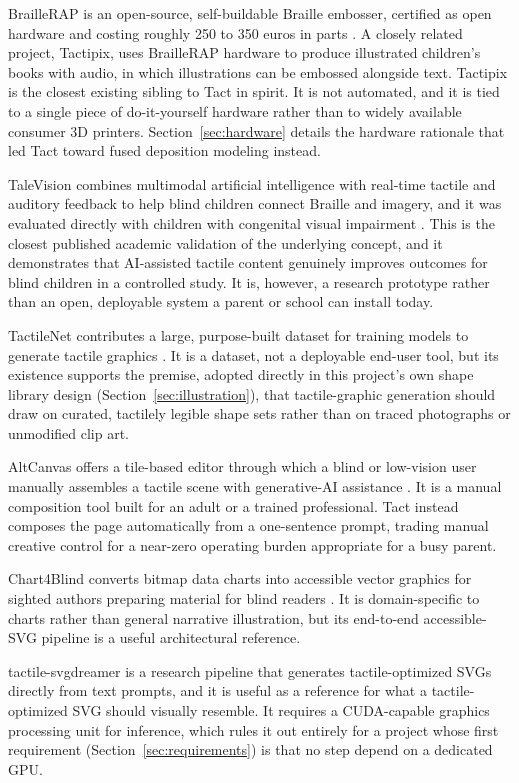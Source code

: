 \documentclass[conference]{IEEEtran}
\begin{document}
BrailleRAP is an open-source, self-buildable Braille embosser, certified as open hardware and costing roughly 250 to 350 euros in parts \cite{braillerap}. A closely related project, Tactipix, uses BrailleRAP hardware to produce illustrated children's books with audio, in which illustrations can be embossed alongside text. Tactipix is the closest existing sibling to Tact in spirit. It is not automated, and it is tied to a single piece of do-it-yourself hardware rather than to widely available consumer 3D printers. Section~\ref{sec:hardware} details the hardware rationale that led Tact toward fused deposition modeling instead.

TaleVision combines multimodal artificial intelligence with real-time tactile and auditory feedback to help blind children connect Braille and imagery, and it was evaluated directly with children with congenital visual impairment \cite{talevision}. This is the closest published academic validation of the underlying concept, and it demonstrates that AI-assisted tactile content genuinely improves outcomes for blind children in a controlled study. It is, however, a research prototype rather than an open, deployable system a parent or school can install today.

TactileNet contributes a large, purpose-built dataset for training models to generate tactile graphics \cite{tactilenet}. It is a dataset, not a deployable end-user tool, but its existence supports the premise, adopted directly in this project's own shape library design (Section~\ref{sec:illustration}), that tactile-graphic generation should draw on curated, tactilely legible shape sets rather than on traced photographs or unmodified clip art.

AltCanvas offers a tile-based editor through which a blind or low-vision user manually assembles a tactile scene with generative-AI assistance \cite{altcanvas}. It is a manual composition tool built for an adult or a trained professional. Tact instead composes the page automatically from a one-sentence prompt, trading manual creative control for a near-zero operating burden appropriate for a busy parent.

Chart4Blind converts bitmap data charts into accessible vector graphics for sighted authors preparing material for blind readers \cite{chart4blind}. It is domain-specific to charts rather than general narrative illustration, but its end-to-end accessible-SVG pipeline is a useful architectural reference.

tactile-svgdreamer is a research pipeline that generates tactile-optimized SVGs directly from text prompts, and it is useful as a reference for what a tactile-optimized SVG should visually resemble. It requires a CUDA-capable graphics processing unit for inference, which rules it out entirely for a project whose first requirement (Section~\ref{sec:requirements}) is that no step depend on a dedicated GPU.
\end{document}
